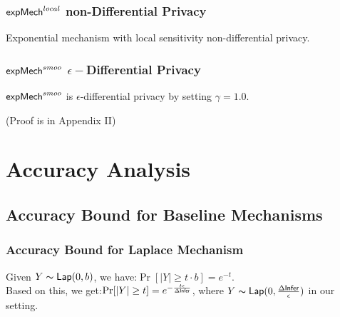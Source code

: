 \documentclass{article}
\begin{document}
\subsubsection{$\mathsf{expMech}^{local}$ non-Differential Privacy}
Exponential mechanism with local sensitivity non-differential privacy.

\subsubsection{$\mathsf{expMech}^{smoo}$ $\epsilon-$Differential Privacy}

\begin{lem}
\label{lem_hexpmech_privacy}
$\mathsf{expMech}^{smoo}$ is $\epsilon$-differential privacy by setting $\gamma = 1.0$.
\end{lem}
(Proof is in Appendix II)



\section{Accuracy Analysis}

\subsection{Accuracy Bound for Baseline Mechanisms}



\subsubsection{Accuracy Bound for Laplace Mechanism}
\label{subsec_accuracy_lap}
Given $Y \thicksim \mathsf{Lap}(0, b)$, we have\cite{dwork2014algorithmic}:$\Pr[|Y| \geq t \cdot b] = e^{- t}.$\\
Based on this, we get:$\Pr[|Y| \geq t] = e^{- \frac{t \epsilon}{\Delta \mathsf{Infer}}}$, where $Y \thicksim \mathsf{Lap}(0, \frac{\Delta \mathsf{Infer}}{\epsilon})$ in our setting.
\end{document}
